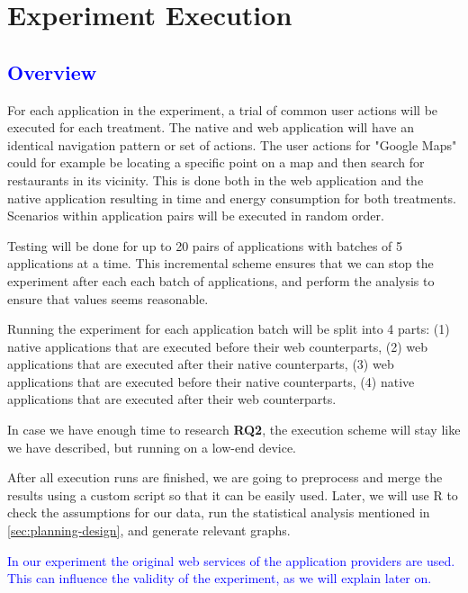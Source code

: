 \section{Experiment Execution}\label{sec:execution}
\subsection{\textcolor{blue}{Overview}}
For each application in the experiment, a trial of common user actions will be executed for each treatment. The native and web application will have an identical navigation pattern or set of actions. The user actions for "Google Maps" could for example be locating a specific point on a map and then search for restaurants in its vicinity. This is done both in the web application and the native application resulting in time and energy consumption for both treatments. Scenarios within application pairs will be executed in random order. 

Testing will be done for up to 20 pairs of applications with batches of 5 applications at a time. This incremental scheme ensures that we can stop the experiment after each each batch of applications, and perform the analysis to ensure that values seems reasonable.

Running the experiment for each application batch will be split into 4 parts: (1) native applications that are executed before their web counterparts, (2) web applications that are executed after their native counterparts, (3) web applications that are executed before their native counterparts, (4) native applications that are executed after their web counterparts.

In case we have enough time to research \textbf{RQ2}, the execution scheme will stay like we have described, but running on a low-end device.

After all execution runs are finished, we are going to preprocess and merge the results using a custom script so that it can be easily used. Later, we will use R to check the assumptions for our data, run the statistical analysis mentioned in \autoref{sec:planning-design}, and generate relevant graphs.

\textcolor{blue}{In our experiment the original web services of the application providers are used. This can influence the validity of the experiment, as we will explain later on.}






